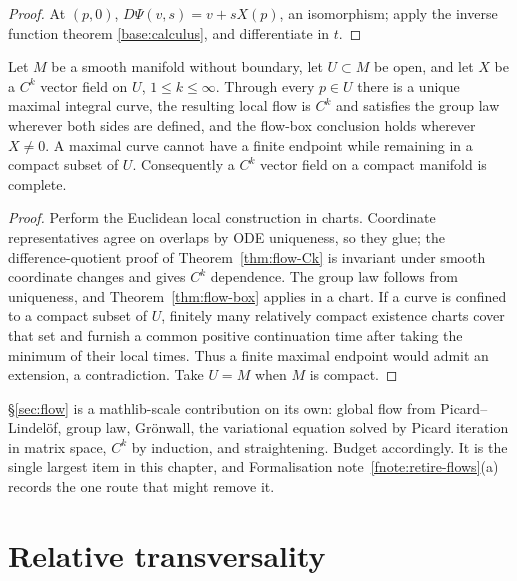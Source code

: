 \begin{proof}
At $(p,0)$, $D\Psi(v,s)=v+sX(p)$, an isomorphism; apply the inverse function
theorem \ref{base:calculus}, and differentiate in $t$.
\end{proof}

\begin{corollary}\label{cor:flow-manifold}
Let $M$ be a smooth manifold without boundary, let $U\subset M$ be open, and
let $X$ be a $C^k$ vector field on $U$, $1\le k\le\infty$.  Through every
$p\in U$ there is a unique maximal integral curve, the resulting local flow
is $C^k$ and satisfies the group law wherever both sides are defined, and the
flow-box conclusion holds wherever $X\ne0$.  A maximal curve cannot have a
finite endpoint while remaining in a compact subset of $U$.  Consequently a
$C^k$ vector field on a compact manifold is complete.
\end{corollary}

\begin{proof}
Perform the Euclidean local construction in charts.  Coordinate
representatives agree on overlaps by ODE uniqueness, so they glue; the
difference-quotient proof of Theorem~\ref{thm:flow-Ck} is invariant under
smooth coordinate changes and gives $C^k$ dependence.  The group law follows
from uniqueness, and Theorem~\ref{thm:flow-box} applies in a chart.
If a curve is confined to a compact subset of $U$, finitely many relatively
compact existence charts cover that set and furnish a common positive
continuation time after taking the minimum of their local times.  Thus a
finite maximal endpoint would admit an extension, a contradiction.  Take
$U=M$ when $M$ is compact.
\end{proof}

\begin{fnote}[Cost]\label{fnote:flow-cost}
\S\ref{sec:flow} is a mathlib-scale contribution on its own: global flow from
Picard--Lindel\"of, group law, Gr\"onwall, the variational equation solved by
Picard iteration in matrix space, $C^k$ by induction, and straightening.
Budget accordingly.  It is the single largest item in this chapter, and
Formalisation note~\ref{fnote:retire-flows}(a) records the one route that
might remove it.
\end{fnote}

\section{Relative transversality}\label{sec:transversality}

